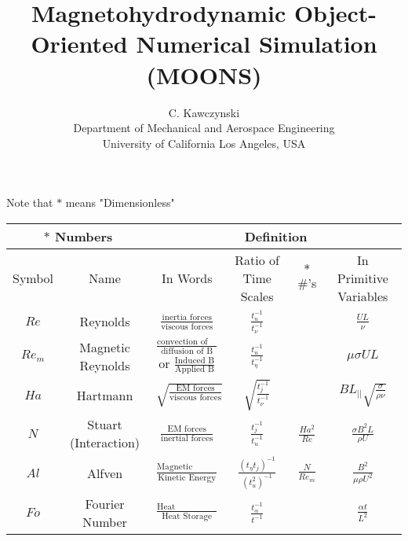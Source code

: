 \documentclass[landscape, 12pt]{report}
\begin{document}
\doublespacing
\title{Magnetohydrodynamic Object-Oriented Numerical Simulation (MOONS)}
\author{C. Kawczynski \\
Department of Mechanical and Aerospace Engineering \\
University of California Los Angeles, USA\\}
\maketitle

Note that $*$ means "Dimensionless"

\resizebox{19cm}{!} {
	\begin{tabular}{|c|c|c|c|c|c|}
		\hline

		\multicolumn{2}{|c|}{$*$ Numbers} & \multicolumn{4}{|c|}{Definition} \\
		\hline
		Symbol & 
		Name &	
		In Words & 
		Ratio of Time Scales & 
		$*$ \#'s & 
		In Primitive Variables \\

		\hline \hline \hline
		\hline \hline \hline

		$Re$ 
		& Reynolds 
		& $\frac{\text{inertia forces}}{\text{viscous forces}}$
		& $\frac{t_u^{-1}}{t_{\nu}^{-1}}$
		&
		& $\frac{U L}{\nu}$ \\
		\hline

		$Re_m$ 
		& Magnetic Reynolds 
		& $\frac{\text{convection of B}}{\text{diffusion of B}}$
		or $\frac{\text{Induced B}}{\text{Applied B}}$
		& $\frac{t_u^{-1}}{t_{\eta}^{-1}}$
		&
		& $\mu \sigma U L$ \\
		\hline

		$Ha$ 
		& Hartmann
		& $\sqrt{\frac{\text{EM forces}}{\text{viscous forces}}}$
		& $\sqrt{\frac{t_{j}^{-1}}{t_{\nu}^{-1}}}$
		&
		& $B L_{||} \sqrt{\frac{\sigma}{\rho \nu}}$ \\
		\hline

		$N$ 
		& Stuart (Interaction)
		& $\frac{\text{EM forces}}{\text{inertial forces}}$
		& $\frac{t_j^{-1}}{t_{u}^{-1}}$
		& $\frac{Ha^2}{Re}$
		& $\frac{\sigma B^2 L}{\rho U}$ \\
		\hline

		$Al$ 
		& Alfven
		& $\frac{\text{Magnetic Energy}}{\text{Kinetic Energy}}$
		& $\frac{(t_{\eta} t_j)^{-1}}{(t_{u}^2)^{-1}}$
		& $\frac{N}{Re_m}$
		& $\frac{B^2}{\mu \rho U^2}$ \\
		\hline

		$Fo$ 
		& Fourier Number
		& $\frac{\text{Heat Conduction}}{\text{Heat Storage}}$
		& $\frac{t_{\alpha}^{-1}}{t^{-1}}$
		& 
		& $\frac{\alpha t}{L^2}$ \\
		\hline


\end{tabular}}
\end{document}
